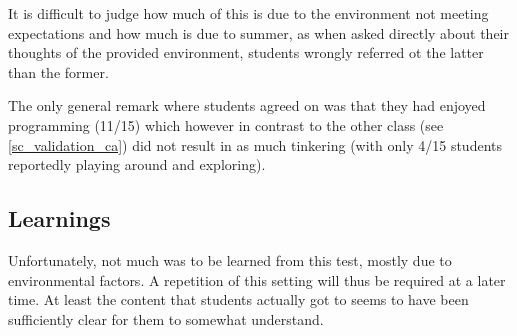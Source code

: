It is difficult to judge how much of this is due to the environment not meeting expectations and how much is due to summer, as when asked directly about their thoughts of the provided environment, students wrongly referred ot the latter than the former.

The only general remark where students agreed on was that they had enjoyed programming (11/15) which however in contrast to the other class (see \ref{sc_validation_ca}) did not result in as much tinkering (with only 4/15 students reportedly playing around and exploring).


\subsection{Learnings}

Unfortunately, not much was to be learned from this test, mostly due to environmental factors. A repetition of this setting will thus be required at a later time. At least the content that students actually got to seems to have been sufficiently clear for them to somewhat understand.
